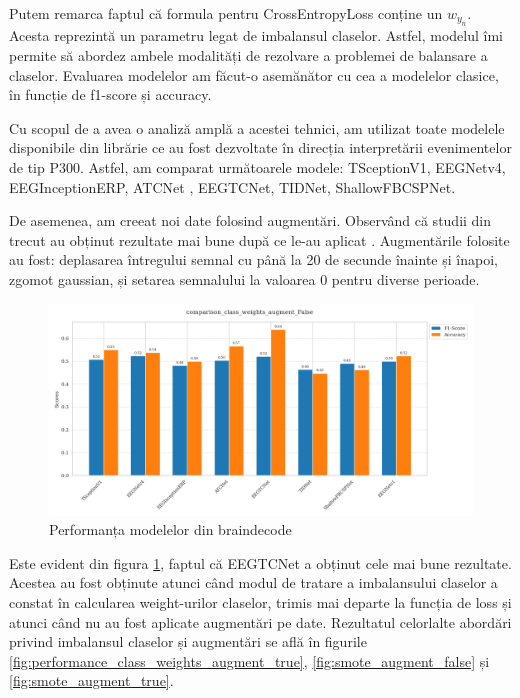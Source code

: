 Putem remarca faptul că formula pentru CrossEntropyLoss conține un \(w_{y_n}\). Acesta reprezintă un parametru legat de imbalansul claselor. Astfel, modelul îmi permite să abordez ambele modalități de rezolvare a problemei de balansare a claselor. Evaluarea modelelor am făcut-o asemănător cu cea a modelelor clasice, în funcție de f1-score și accuracy.

Cu scopul de a avea o analiză amplă a acestei tehnici, am utilizat toate modelele disponibile din librărie ce au fost dezvoltate în direcția interpretării evenimentelor de tip P300. Astfel, am comparat următoarele modele: TSceptionV1\cite{TSception}, EEGNetv4\cite{eegnetv4}, EEGInceptionERP\cite{eeginceptionerp}, ATCNet \cite{atcnet1}\cite{atcnet2}\cite{atcnet3}, EEGTCNet\cite{tcnet}, TIDNet\cite{tidnet}, ShallowFBCSPNet\cite{ShallowFBCSPNet}.

De asemenea, am creeat noi date folosind augmentări. Observând că studii din trecut au obținut rezultate mai bune după ce le-au aplicat \cite{Wang2018}. Augmentările folosite au fost: deplasarea întregului semnal cu până la 20 de secunde înainte și înapoi, zgomot gaussian, și setarea semnalului la valoarea 0 pentru diverse perioade.

\vspace{1em}
\begin{figure}[h]
    \centering
    \includegraphics[width=1\textwidth]{images/comparison_class_weights_augment_False.png}
    \caption{Performanța modelelor din braindecode}
    \label{fig:performanta_braindecode}
\end{figure}

Este evident din figura \ref{fig:performanta_braindecode}, faptul că EEGTCNet\cite{tcnet} a obținut cele mai bune rezultate. Acestea au fost obținute atunci când modul de tratare a imbalansului claselor a constat în calcularea weight-urilor claselor, trimis mai departe la funcția de loss și atunci când nu au fost aplicate augmentări pe date. Rezultatul celorlalte abordări privind imbalansul claselor și augmentări se află în figurile \ref{fig:performance_class_weights_augment_true}, \ref{fig:smote_augment_false} și \ref{fig:smote_augment_true}.


